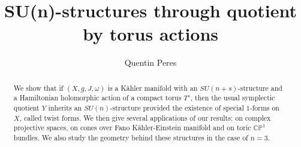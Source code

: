 \documentclass[12pt, reqno]{amsart}
\title{SU(n)-structures through quotient by torus actions}
\author{Quentin Peres}
\newcommand{\C}{\mathbb{C}}
\newcommand{\p}{\mathbb{P}}
\begin{document}
\address{Quentin Peres \\Institut Camille Jordan, Université Claude Bernard Lyon 1 \\ 69100 Villeurbanne,France}
\setcounter{page}{1}
\maketitle
\begin{abstract} We show that if $(X,g,J,\omega)$ is a Kähler manifold with an $SU(n+s)$-structure and a Hamiltonian holomorphic action of a compact torus $T^s$, then the usual symplectic quotient $Y$ inherits an $SU(n)$-structure provided the existence of special $1$-forms on $X$, called twist forms. We then give several applications of our results: on complex projective spaces, on cones over Fano Kähler-Einstein manifold and on toric $\C\p^1$ bundles. We also study the geometry behind these structures in the case of $n=3$.
\end{abstract} 
\end{document}
